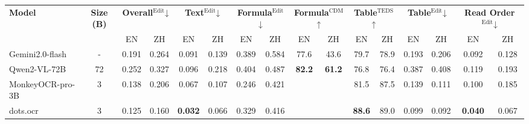 \documentclass{article}
\newcommand{\bestA}[1]{\cellcolor{blue!12}\textbf{#1}}  %
\begin{document}
\begin{table}[h!]
\centering
\small
\setlength{\tabcolsep}{4pt}
\begin{adjustbox}{max width=\linewidth, keepaspectratio}
\begin{tabular}{l c c c c c c c c c c c c c c c}
\toprule
\multirow{2}{*}{\textbf{Model}} & \multirow{2}{*}{\textbf{Size (B)}} & \multicolumn{2}{c}{\textbf{Overall}$^{\text{Edit}}$↓} & \multicolumn{2}{c}{\textbf{Text}$^{\text{Edit}}$↓} & \multicolumn{2}{c}{\textbf{Formula}$^{\text{Edit}}$↓} & \multicolumn{2}{c}{\textbf{Formula}$^{\text{CDM}}$↑} & \multicolumn{2}{c}{\textbf{Table}$^{\text{TEDS}}$↑} & \multicolumn{2}{c}{\textbf{Table}$^{\text{Edit}}$↓} & \multicolumn{2}{c}{\textbf{Read Order}$^{\text{Edit}}$↓} \\
\cmidrule(lr){3-16}
& & EN & ZH & EN & ZH & EN & ZH & EN & ZH & EN & ZH & EN & ZH & EN & ZH \\
\midrule
Gemini2.0-flash & - & 0.191 & 0.264 & 0.091 & 0.139 & 0.389 & 0.584 & 77.6 & 43.6 & 79.7 & 78.9 & 0.193 & 0.206 & 0.092 & 0.128 \\
Qwen2-VL-72B & 72 & 0.252 & 0.327 & 0.096 & 0.218 & 0.404 & 0.487 & \bestA{82.2} & \bestA{61.2} & 76.8 & 76.4 & 0.387 & 0.408 & 0.119 & 0.193 \\
MonkeyOCR-pro-3B & 3 & 0.138 & 0.206 & 0.067 & 0.107 & 0.246 & 0.421 &  &  & 81.5 & 87.5 & 0.139 & 0.111 & 0.100 & 0.185 \\
dots.ocr & 3 & 0.125 & 0.160 & \bestA{0.032} & 0.066 & 0.329 & 0.416 &  &  & \bestA{88.6} & 89.0 & 0.099 & 0.092 & \bestA{0.040} & 0.067 \\

\end{tabular}
\end{adjustbox}
\end{table}
\end{document}
